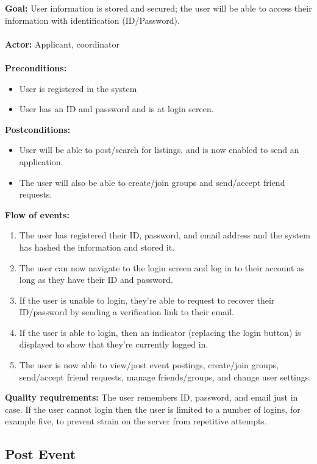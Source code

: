 \documentclass[a4paper]{article}
\begin{document}
\textbf{Goal:} 
User information is stored and secured; the user will be able to access their information with identification (ID/Password).\\
\\
\textbf{Actor:} 
Applicant, coordinator\\ 
\\
\textbf{Preconditions:} 
\begin{itemize}
\item User is registered in the system
\item User has an ID and password and is at login screen.
\end{itemize}
\textbf{Postconditions:} 
\begin{itemize}
\item User will be able to post/search for listings, and is now enabled to send an application. 
\item The user will also be able to create/join groups and send/accept friend requests.
\end{itemize}
\textbf{Flow of events:} 
\begin{enumerate}
\item The user has registered their ID, password, and email address and the system has hashed the information and stored it. 
\item The user can now navigate to the login screen and log in to their account as long as they have their ID and password. 
\item If the user is unable to login, they're able to request to recover their ID/password by sending a verification link to their email. 
\item If the user is able to login, then an indicator (replacing the login button) is displayed to show that they're currently logged in. 
\item The user is now able to view/post event postings, create/join groups, send/accept friend requests, manage friends/groups, and change user settings. 
\end{enumerate}
\textbf{Quality requirements:} 
The user remembers ID, password, and email just in case. If the user cannot login then the user is limited to a number of logins, for example five, to prevent strain on the server from repetitive attempts.

\subsection{Post Event}
\end{document}

